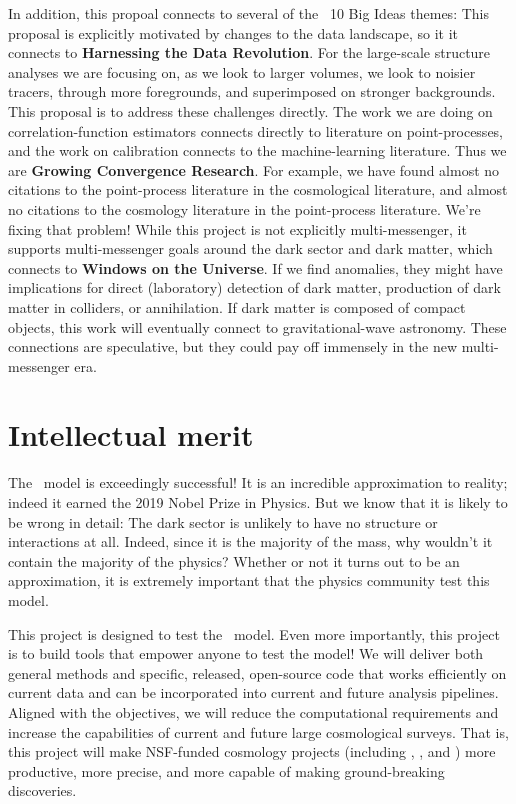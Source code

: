 \documentclass[12pt, fullpage, letterpaper]{article}
\begin{document}
In addition, this propoal connects to several of the \NSF\ 10 Big Ideas themes:
This proposal is explicitly motivated by changes to the data landscape,
so it it connects to \textbf{Harnessing the Data Revolution}.
For the large-scale structure analyses we are focusing on, as we look to larger volumes, we look
to noisier tracers, through more foregrounds, and superimposed on
stronger backgrounds. This proposal is to address these challenges
directly.
The work we are doing on correlation-function estimators connects
directly to literature on point-processes, and the work on calibration
connects to the machine-learning literature. Thus we are
\textbf{Growing Convergence Research}.
For example, we have found almost no citations to the point-process
literature in the cosmological literature, and almost no citations to
the cosmology literature in the point-process literature.
We're fixing that problem!
While this project is not explicitly multi-messenger, it supports
multi-messenger goals around the dark sector and dark matter, which
connects to \textbf{Windows on the Universe}.
If we find anomalies, they might have implications for direct (laboratory)
detection of dark matter, production of dark matter in colliders, or
annihilation. If dark matter is composed of compact objects, this work
will eventually connect to gravitational-wave astronomy. These
connections are speculative, but they could pay off immensely in the
new multi-messenger era.

\section{Intellectual merit}

The \LCDM\ model is exceedingly successful!
It is an incredible approximation to reality; indeed it earned the 2019 Nobel Prize in Physics.
But we know that it is likely to be wrong in detail:
The dark sector is unlikely to have no structure or interactions at all.
Indeed, since it is the majority of the mass, why wouldn't it contain the majority
of the physics?
Whether or not it turns out to be an approximation, it is extremely important that
the physics community test this model.

This project is designed to test the \LCDM\ model.
Even more importantly, this project is to build tools that empower anyone to test the model!
We will deliver both general methods and specific, released,
open-source code that works efficiently on current data and can be
incorporated into current and future analysis pipelines.
Aligned with the  objectives, we will reduce the computational requirements and
increase the capabilities of current and future large cosmological surveys.
That is, this project will make NSF-funded cosmology projects (including
\SDSSIV, \DESI, and \LSST) more productive, more precise, and more
capable of making ground-breaking discoveries.
\end{document}
